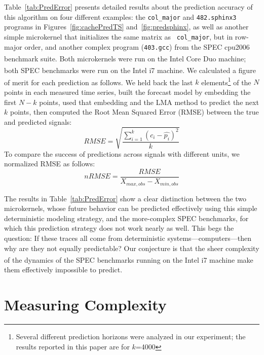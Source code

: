 \documentclass{article}
\begin{document}
Table~\ref{tab:PredError} presents detailed results about the
prediction accuracy of this algorithm on four different examples: the
{\tt col\_major} and {\tt 482.sphinx3} programs in
Figures~\ref{fig:cachePredTS} and~\ref{fig:predsphinx}, as well as
another simple microkernel that initializes the same matrix as {\tt
  col\_major}, but in row-major order, and another complex program
({\tt 403.gcc}) from the SPEC cpu2006 benchmark suite.  Both
microkernels were run on the Intel Core
Duo\textsuperscript{\textregistered} machine; both SPEC benchmarks
were run on the Intel i7\textsuperscript{\textregistered} machine.  We
calculated a figure of merit for each prediction as follows.  We held
back the last $k$ elements\footnote{Several different prediction
  horizons were analyzed in our experiment; the results reported in
  this paper are for $k$=4000} of the $N$ points in each measured time
series, built the forecast model by embedding the first $N-k$ points,
used that embedding and the LMA method to predict the next $k$ points,
then computed the Root Mean Squared Error (RMSE) between the true and
predicted signals:
$$RMSE = \sqrt{\frac{\sum_{i=1}^k(c_i-\hat{p_i})^2}{k}}$$
%
To compare the success of predictions across signals with different
units, we normalized RMSE as follows:
$$nRMSE = \frac{RMSE}{X_{max,obs}-X_{min,obs}}$$
%



The results in Table~\ref{tab:PredError} show a clear distinction
between the two microkernels, whose future behavior can be
predicted effectively using this simple deterministic modeling
strategy, and the more-complex SPEC benchmarks, for which this
prediction strategy does not work nearly as well.
%
This begs the question: If these traces all come from deterministic
systems---computers---then why are they not equally predictable?  Our
conjecture is that the sheer complexity of the dynamics of the SPEC
benchmarks running on the Intel i7\textsuperscript{\textregistered}
machine make them effectively impossible to predict.


\section{Measuring Complexity}\label{sec:meaComplex}
\end{document}
